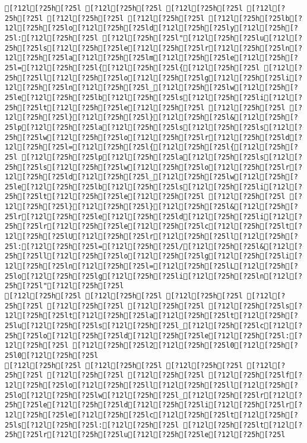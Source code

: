 \documentclass{scrartcl}
\begin{document}
\begin{Verbatim}
[?12l[?25h[?25l [?12l[?25h[?25l [?12l[?25h[?25l [?12l[?25h[?25l [?12l[?25h[?25l [?12l[?25h[?25l [?12l[?25h[?25lb[?12l[?25h[?25lo[?12l[?25h[?25ld[?12l[?25h[?25ly[?12l[?25h[?25l:[?12l[?25h[?25l [?12l[?25h[?25l"[?12l[?25h[?25lu[?12l[?25h[?25ls[?12l[?25h[?25le[?12l[?25h[?25lr[?12l[?25h[?25ln[?12l[?25h[?25la[?12l[?25h[?25lm[?12l[?25h[?25le[?12l[?25h[?25l=[?12l[?25h[?25l{[?12l[?25h[?25l{[?12l[?25h[?25l [?12l[?25h[?25ll[?12l[?25h[?25lo[?12l[?25h[?25lg[?12l[?25h[?25li[?12l[?25h[?25ln[?12l[?25h[?25l_[?12l[?25h[?25lw[?12l[?25h[?25le[?12l[?25h[?25lb[?12l[?25h[?25ls[?12l[?25h[?25li[?12l[?25h[?25lt[?12l[?25h[?25le[?12l[?25h[?25l [?12l[?25h[?25l [?12l[?25h[?25l}[?12l[?25h[?25l}[?12l[?25h[?25l&[?12l[?25h[?25lp[?12l[?25h[?25la[?12l[?25h[?25ls[?12l[?25h[?25ls[?12l[?25h[?25lw[?12l[?25h[?25lo[?12l[?25h[?25lr[?12l[?25h[?25ld[?12l[?25h[?25l=[?12l[?25h[?25l{[?12l[?25h[?25l{[?12l[?25h[?25l [?12l[?25h[?25lp[?12l[?25h[?25la[?12l[?25h[?25ls[?12l[?25h[?25ls[?12l[?25h[?25lw[?12l[?25h[?25lo[?12l[?25h[?25lr[?12l[?25h[?25ld[?12l[?25h[?25l_[?12l[?25h[?25lw[?12l[?25h[?25le[?12l[?25h[?25lb[?12l[?25h[?25ls[?12l[?25h[?25li[?12l[?25h[?25lt[?12l[?25h[?25le[?12l[?25h[?25l [?12l[?25h[?25l [?12l[?25h[?25l}[?12l[?25h[?25l}[?12l[?25h[?25l&[?12l[?25h[?25lr[?12l[?25h[?25le[?12l[?25h[?25ld[?12l[?25h[?25li[?12l[?25h[?25lr[?12l[?25h[?25le[?12l[?25h[?25lc[?12l[?25h[?25lt[?12l[?25h[?25lU[?12l[?25h[?25lr[?12l[?25h[?25ll[?12l[?25h[?25l:[?12l[?25h[?25l=[?12l[?25h[?25l/[?12l[?25h[?25l&[?12l[?25h[?25ll[?12l[?25h[?25lo[?12l[?25h[?25lg[?12l[?25h[?25li[?12l[?25h[?25ln[?12l[?25h[?25l=[?12l[?25h[?25lL[?12l[?25h[?25lo[?12l[?25h[?25lg[?12l[?25h[?25li[?12l[?25h[?25ln[?12l[?25h[?25l"[?12l[?25h[?25l
[?12l[?25h[?25l [?12l[?25h[?25l [?12l[?25h[?25l [?12l[?25h[?25l [?12l[?25h[?25l [?12l[?25h[?25l [?12l[?25h[?25ls[?12l[?25h[?25lt[?12l[?25h[?25la[?12l[?25h[?25lt[?12l[?25h[?25lu[?12l[?25h[?25ls[?12l[?25h[?25l_[?12l[?25h[?25lc[?12l[?25h[?25lo[?12l[?25h[?25ld[?12l[?25h[?25le[?12l[?25h[?25l:[?12l[?25h[?25l [?12l[?25h[?25l2[?12l[?25h[?25l0[?12l[?25h[?25l0[?12l[?25h[?25l
[?12l[?25h[?25l [?12l[?25h[?25l [?12l[?25h[?25l [?12l[?25h[?25l [?12l[?25h[?25l [?12l[?25h[?25l [?12l[?25h[?25lf[?12l[?25h[?25lo[?12l[?25h[?25ll[?12l[?25h[?25ll[?12l[?25h[?25lo[?12l[?25h[?25lw[?12l[?25h[?25l_[?12l[?25h[?25lr[?12l[?25h[?25le[?12l[?25h[?25ld[?12l[?25h[?25li[?12l[?25h[?25lr[?12l[?25h[?25le[?12l[?25h[?25lc[?12l[?25h[?25lt[?12l[?25h[?25ls[?12l[?25h[?25l:[?12l[?25h[?25l [?12l[?25h[?25lt[?12l[?25h[?25lr[?12l[?25h[?25lu[?12l[?25h[?25le[?12l[?25h[?25l

\end{Verbatim}
\end{document}
